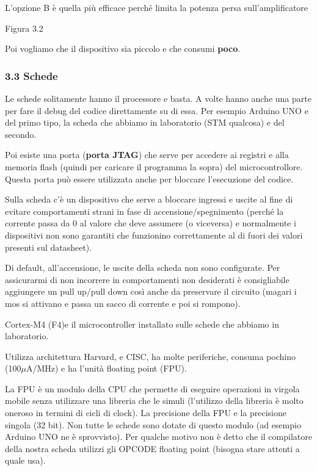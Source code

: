 \documentclass[
]{article}
\begin{document}
L'opzione B è quella più efficace perché limita la potenza persa
sull'amplificatore

Figura 3.2

Poi vogliamo che il dispositivo sia piccolo e che consumi \textbf{poco}.

\subsubsection{3.3 Schede}\label{schede}

Le schede solitamente hanno il processore e basta. A volte hanno anche
una parte per fare il debug del codice direttamente su di essa. Per
esempio Arduino UNO e del primo tipo, la scheda che abbiamo in
laboratorio (STM qualcosa) e del secondo.

Poi esiste una porta (\textbf{porta JTAG}) che serve per accedere ai
registri e alla memoria flash (quindi per caricare il programma la
sopra) del microcontrollore. Questa porta può essere utilizzata anche
per bloccare l'esecuzione del codice.

Sulla scheda c'è un dispositivo che serve a bloccare ingressi e uscite
al fine di evitare comportamenti strani in fase di
accensione/spegnimento (perché la corrente passa da 0 al valore che deve
assumere (o viceversa) e normalmente i dispositivi non sono garantiti
che funzionino correttamente al di fuori dei valori presenti sul
datasheet).

Di default, all'accensione, le uscite della scheda non sono configurate.
Per assicurarmi di non incorrere in comportamenti non desiderati è
consigliabile aggiungere un pull up/pull down così anche da preservare
il circuito (magari i mos si attivano e passa un sacco di corrente e poi
si rompono).

Cortex-M4 (F4)e il microcontroller installato sulle schede che abbiamo
in laboratorio.

Utilizza architettura Harvard, e CISC, ha molte periferiche, consuma
pochino (100\(\mu\)A/MHz) e ha l'unità floating point (FPU).

La FPU è un modulo della CPU che permette di eseguire operazioni in
virgola mobile senza utilizzare una libreria che le simuli (l'utilizzo
della libreria è molto oneroso in termini di cicli di clock). La
precisione della FPU e la precisione singola (32 bit). Non tutte le
schede sono dotate di questo modulo (ad esempio Arduino UNO ne è
sprovvisto). Per qualche motivo non è detto che il compilatore della
nostra scheda utilizzi gli OPCODE floating point (bisogna stare attenti
a quale usa).
\end{document}
